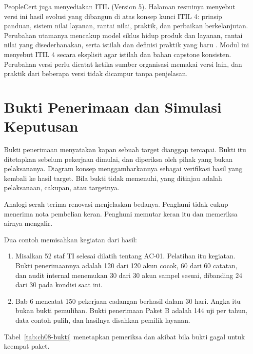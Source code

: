 PeopleCert juga menyediakan ITIL (Version 5). Halaman resminya menyebut versi ini hasil evolusi
yang dibangun di atas konsep kunci ITIL 4: prinsip panduan, sistem nilai layanan, rantai nilai,
praktik, dan perbaikan berkelanjutan. Perubahan utamanya mencakup model siklus hidup produk dan
layanan, rantai nilai yang disederhanakan, serta istilah dan definisi praktik yang baru
\cite{c08-itil5-foundation}. Modul ini menyebut ITIL 4 secara eksplisit agar istilah dan bahan
capstone konsisten. Perubahan versi perlu dicatat ketika sumber organisasi memakai versi lain, dan
praktik dari beberapa versi tidak dicampur tanpa penjelasan.

\section{Bukti Penerimaan dan Simulasi Keputusan}

Bukti penerimaan menyatakan kapan sebuah target dianggap tercapai. Bukti itu ditetapkan sebelum
pekerjaan dimulai, dan diperiksa oleh pihak yang bukan pelaksananya. Diagram konsep
menggambarkannya sebagai verifikasi hasil yang kembali ke hasil target. Bila bukti tidak memenuhi,
yang ditinjau adalah pelaksanaan, cakupan, atau targetnya.

Analogi serah terima renovasi menjelaskan bedanya. Penghuni tidak cukup menerima nota pembelian
keran. Penghuni memutar keran itu dan memeriksa airnya mengalir.

Dua contoh memisahkan kegiatan dari hasil:
\begin{enumerate}
  \item Misalkan 52 staf TI selesai dilatih tentang AC-01. Pelatihan itu kegiatan. Bukti
  penerimaannya adalah 120 dari 120 akun cocok, 60 dari 60 catatan, dan audit internal menemukan
  30 dari 30 akun sampel sesuai, dibanding 24 dari 30 pada kondisi saat ini.
  \item Bab 6 mencatat 150 pekerjaan cadangan berhasil dalam 30 hari. Angka itu bukan bukti
  pemulihan. Bukti penerimaan Paket B adalah 144 uji per tahun, data contoh pulih, dan hasilnya
  disahkan pemilik layanan.
\end{enumerate}

Tabel~\ref{tab:ch08-bukti} menetapkan pemeriksa dan akibat bila bukti gagal untuk keempat paket.

